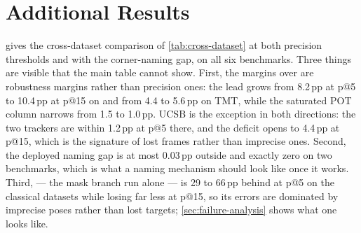 \section{Additional Results}
\label{sec:supp-results}

 gives the cross-dataset comparison of \cref{tab:cross-dataset} at both precision thresholds and with the corner-naming gap, on all six benchmarks.
Three things are visible that the main table cannot show.
First, the margins over \woftsam are robustness margins rather than precision ones: the lead grows from 8.2\,pp at p@5 to 10.4\,pp at p@15 on \pttst and from 4.4 to 5.6\,pp on TMT, while the saturated POT column narrows from 1.5 to 1.0\,pp.
UCSB is the exception in both directions: the two trackers are within 1.2\,pp at p@5 there, and the deficit opens to 4.4\,pp at p@15, which is the signature of lost frames rather than imprecise ones.
Second, the deployed naming gap is at most 0.03\,pp outside \pttst and exactly zero on two benchmarks, which is what a naming mechanism should look like once it works.
Third, \samh --- the mask branch run alone --- is 29 to 66\,pp behind \woftsam at p@5 on the classical datasets while losing far less at p@15, so its errors are dominated by imprecise poses rather than lost targets; \cref{sec:failure-analysis} shows what one looks like.


